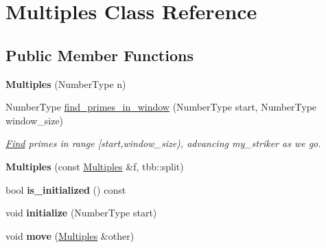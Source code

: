 \hypertarget{classMultiples}{}\section{Multiples Class Reference}
\label{classMultiples}
\subsection*{Public Member Functions}
\begin{DoxyCompactItemize}
\item 
\hypertarget{classMultiples_adaba5a4f5e30a6dda1fe96770dabcf36}{}{\bfseries Multiples} (Number\+Type n)\label{classMultiples_adaba5a4f5e30a6dda1fe96770dabcf36}

\item 
Number\+Type \hyperlink{classMultiples_a997a1be68df34c19b38fcbcb81f001cb}{find\+\_\+primes\+\_\+in\+\_\+window} (Number\+Type start, Number\+Type window\+\_\+size)
\begin{DoxyCompactList}\small\item\em \hyperlink{structFind}{Find} primes in range \mbox{[}start,window\+\_\+size), advancing my\+\_\+striker as we go. \end{DoxyCompactList}\item 
\hypertarget{classMultiples_a3248420e0ca7da3d31c33508794a746b}{}{\bfseries Multiples} (const \hyperlink{classMultiples}{Multiples} \&f, tbb\+::split)\label{classMultiples_a3248420e0ca7da3d31c33508794a746b}

\item 
\hypertarget{classMultiples_af3e12877e5c2a8acb66ea06fc401a34c}{}bool {\bfseries is\+\_\+initialized} () const \label{classMultiples_af3e12877e5c2a8acb66ea06fc401a34c}

\item 
\hypertarget{classMultiples_aedeebd0fcc5d82125aa5646e5d87d078}{}void {\bfseries initialize} (Number\+Type start)\label{classMultiples_aedeebd0fcc5d82125aa5646e5d87d078}

\item 
\hypertarget{classMultiples_af3eaae01144ca06f2ad341dffe77e5db}{}void {\bfseries move} (\hyperlink{classMultiples}{Multiples} \&other)\label{classMultiples_af3eaae01144ca06f2ad341dffe77e5db}

\end{DoxyCompactItemize}
